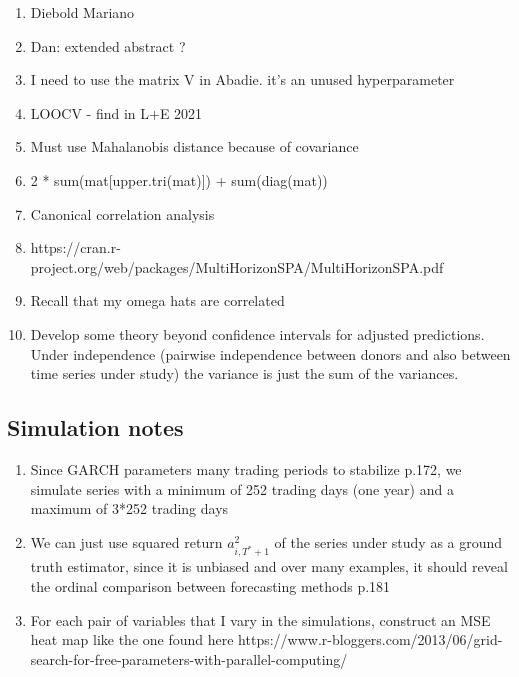 \documentclass[11pt]{article}
\theoremstyle{definition}
\begin{document}
\begin{enumerate}
\item Diebold Mariano
\item Dan: extended abstract ?
\item I need to use the matrix V in Abadie. it's an unused hyperparameter
\item LOOCV - find in L+E 2021
\item Must use Mahalanobis distance because of covariance
\item 2 * sum(mat[upper.tri(mat)]) + sum(diag(mat))
\item Canonical correlation analysis
\item https://cran.r-project.org/web/packages/MultiHorizonSPA/MultiHorizonSPA.pdf
\item Recall that my omega hats are correlated
\item Develop some theory beyond confidence intervals for adjusted predictions.  Under independence (pairwise independence between donors and also between time series under study) the variance is just the sum of the variances.
\end{enumerate}


\subsection{Simulation notes}
\begin{enumerate}
\item Since GARCH parameters many trading periods to stabilize \citep{andersen2009handbook} p.172, we simulate series with a minimum of 252 trading days (one year) and a maximum of 3*252 trading days
\item We can just use squared return $a_{i,T^{*}+1}^{2}$ of the series under study as a ground truth estimator, since it is unbiased and over many examples, it should reveal the ordinal comparison between forecasting methods \citep{andersen2009handbook} p.181
\item For each pair of variables that I vary in the simulations, construct an MSE heat map like the one found here https://www.r-bloggers.com/2013/06/grid-search-for-free-parameters-with-parallel-computing/

\end{enumerate}
\end{document}
